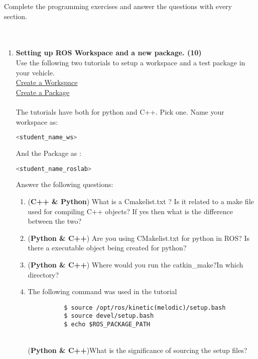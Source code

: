 \documentclass[letta4 paper]{article}
\begin{document}
Complete the programming exercises and answer the questions with every section.\\
\\
\\
\begin{enumerate}
    \item \textbf{Setting up ROS Workspace and a new package. (10)}\\
Use the following two tutorials to setup a workspace and a test package in your vehicle.\\
\href{http://wiki.ros.org/catkin/Tutorials/create_a_workspace}{ Create a Workspace}\\
\href{http://wiki.ros.org/ROS/Tutorials/CreatingPackage}{ Create a Package}\\
\\
The tutorials have both for python and C++. Pick one. 
Name your workspace as:
\begin{lstlisting}[language=bash]
  <student_name_ws>
\end{lstlisting}
And the Package as : 
\begin{lstlisting}[language=bash]
  <student_name_roslab>
\end{lstlisting}
Answer the following questions:
    \begin{enumerate}
        \item (\textbf{C++ \& Python}) What is a Cmakelist.txt ? Is it related to a make file used for compiling C++ objects? If yes then what is the difference between the two?\\
        \item (\textbf{Python \& C++}) Are you using CMakelist.txt for python in ROS? Is there a executable object being created for python? 
        \item (\textbf{Python \& C++}) Where would you run the catkin\_make?In which directory? 
        \item The following command was used in the tutorial\\
        \begin{lstlisting}
          $ source /opt/ros/kinetic(melodic)/setup.bash
          $ source devel/setup.bash
          $ echo $ROS_PACKAGE_PATH
        \end{lstlisting}{}\\
         (\textbf{Python \& C++})What is the significance of sourcing the setup files? \\
        
    \end{enumerate}{}


\end{enumerate}
\end{document}
